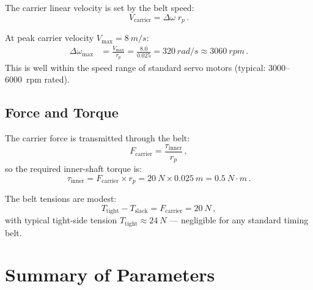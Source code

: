 \documentclass[11pt,a4paper]{article}
\begin{document}
The carrier linear velocity is set by the belt speed:
\begin{equation}
  V_\mathrm{carrier} = \Delta\omega\; r_p\,.
  \label{eq:Vcarrier}
\end{equation}

At peak carrier velocity $V_\mathrm{max} = \SI{8}{m/s}$:
\begin{align}
  \Delta\omega_\mathrm{max}
    &= \frac{V_\mathrm{max}}{r_p}
     = \frac{8.0}{0.025}
     = \SI{320}{rad/s}
     \approx \SI{3060}{rpm}\,.
  \label{eq:omega_inner}
\end{align}
This is well within the speed range of standard servo motors
(typical: 3000--6000~rpm rated).

\subsection{Force and Torque}

The carrier force is transmitted through the belt:
\begin{equation}
  F_\mathrm{carrier} = \frac{\tau_\mathrm{inner}}{r_p}\,,
  \label{eq:Fcarrier}
\end{equation}
so the required inner-shaft torque is:
\begin{equation}
  \tau_\mathrm{inner}
    = F_\mathrm{carrier} \times r_p
    = \SI{20}{N} \times \SI{0.025}{m}
    = \SI{0.5}{N\cdot m}\,.
  \label{eq:tau_inner}
\end{equation}

The belt tensions are modest:
\begin{equation}
  T_\mathrm{tight} - T_\mathrm{slack} = F_\mathrm{carrier}
    = \SI{20}{N}\,,
\end{equation}
with typical tight-side tension $T_\mathrm{tight} \approx \SI{24}{N}$
--- negligible for any standard timing belt.


\section{Summary of Parameters}
\label{sec:summary}
\end{document}
